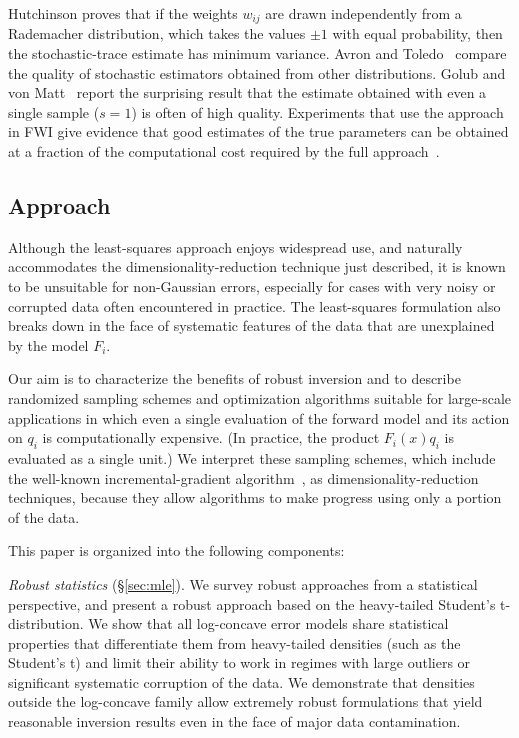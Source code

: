 \documentclass[nospthms]{svjour3}
\numberwithin{equation}{section}
\begin{document}
Hutchinson proves that if the weights $w_{ij}$ are drawn independently
from a Rademacher distribution, which takes the values $\pm1$ with
equal probability, then the stochastic-trace estimate has minimum
variance. Avron and Toledo~\cite{AvronToledo:2011} compare the quality
of stochastic estimators obtained from other distributions. Golub and
von Matt~\cite{GoluMatt:1991} report the surprising result that the
estimate obtained with even a single sample ($s=1$) is often of high
quality. Experiments that use the approach in FWI give evidence that
good estimates of the true parameters can be obtained at a fraction of
the computational cost required by the full
approach~\cite{Krebs09,leeuwen2011,HFY:2011}.

\subsection{Approach}

Although the least-squares approach enjoys widespread use, and
naturally accommodates the dimensionality-reduction technique just
described, it is known to be unsuitable for non-Gaussian errors,
especially for cases with very noisy or corrupted data often encountered in practice.
The least-squares formulation also breaks down in the face of systematic features of the data that
are unexplained by the model $F_i$.

Our aim is to characterize the benefits of robust inversion and to
describe randomized sampling schemes and optimization algorithms
suitable for large-scale applications in which even a single evaluation
of the forward model and its action on $q_i$ is computationally
expensive. (In practice, the product $F_i(x)q_i$ is evaluated as a
single unit.) We interpret these sampling schemes, which include
the well-known incremental-gradient
algorithm~\cite{nedic2000convergence}, as dimensionality-reduction
techniques, because they allow algorithms to make progress using only
a portion of the data.

This paper is organized into the following components:

{\it Robust statistics} (\S\ref{sec:mle}). We survey robust approaches
from a statistical perspective, and present a robust approach based on
the heavy-tailed Student's t-distribution.  We show that all
log-concave error models share statistical properties that
differentiate them from heavy-tailed densities (such as the Student's
t) and limit their ability to work in regimes with large outliers or
significant systematic corruption of the data.  We demonstrate that
densities outside the log-concave family allow extremely robust
formulations that yield reasonable inversion results even in the face
of major data contamination.
\end{document}
